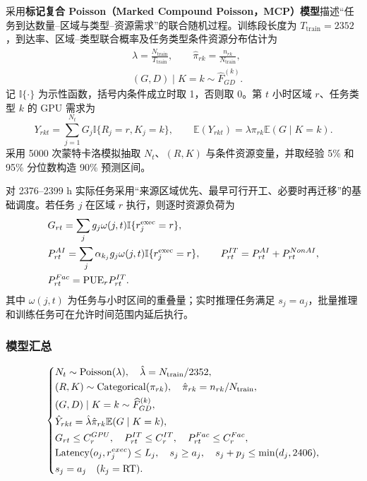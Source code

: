 采用\textbf{标记复合 Poisson（Marked Compound Poisson，MCP）模型}描述“任务到达数量--区域与类型--资源需求”的联合随机过程。训练段长度为 $T_{\mathrm{train}}=2352$，到达率、区域--类型联合概率及任务类型条件资源分布估计为
\begin{align}
&\hat\lambda=\frac{N_{\mathrm{train}}}{T_{\mathrm{train}}},\qquad
\hat\pi_{rk}=\frac{n_{rk}}{N_{\mathrm{train}}},\label{eq:q1-params}\\
&(G,D)\mid K=k\sim\widehat F_{GD}^{(k)}.\label{eq:q1-resource-mark}
\end{align}
记 $\mathbb{I}\{\cdot\}$ 为示性函数，括号内条件成立时取 1，否则取 0。第 $t$ 小时区域 $r$、任务类型 $k$ 的 GPU 需求为
\begin{equation}
Y_{rkt}=\sum_{j=1}^{N_t}G_j\mathbb{I}\{R_j=r,K_j=k\},\qquad
\mathbb E(Y_{rkt})=\lambda\pi_{rk}\mathbb E(G\mid K=k).
\label{eq:q1-demand}
\end{equation}
采用 5000 次蒙特卡洛模拟抽取 $N_t$、$(R,K)$ 与条件资源变量，并取经验 5\% 和 95\% 分位数构造 90\% 预测区间。

对 2376--2399 h 实际任务采用“来源区域优先、最早可行开工、必要时再迁移”的基础调度。若任务 $j$ 在区域 $r$ 执行，则逐时资源负荷为
\begin{align}
&G_{rt}=\sum_j g_j\omega(j,t)\mathbb{I}\{r_j^{\rm exec}=r\},\label{eq:q1-gpu-load}\\
&P^{AI}_{rt}=\sum_j\alpha_{k_j}g_j\omega(j,t)\mathbb{I}\{r_j^{\rm exec}=r\},\qquad
P^{IT}_{rt}=P^{AI}_{rt}+P^{NonAI}_{rt},\label{eq:q1-it-load}\\
&P^{Fac}_{rt}=\mathrm{PUE}_rP^{IT}_{rt}.\label{eq:q1-fac-load}
\end{align}
其中 $\omega(j,t)$ 为任务与小时区间的重叠量；实时推理任务满足 $s_j=a_j$，批量推理和训练任务可在允许时间范围内延后执行。

\subsubsection{模型汇总}

\begin{equation}
\left\{
\begin{aligned}
&N_t\sim\mathrm{Poisson}(\lambda),\quad \hat\lambda=N_{\rm train}/2352,\\
&(R,K)\sim\mathrm{Categorical}(\pi_{rk}),\quad \hat\pi_{rk}=n_{rk}/N_{\rm train},\\
&(G,D)\mid K=k\sim\widehat F_{GD}^{(k)},\\
&\hat Y_{rkt}=\hat\lambda\hat\pi_{rk}\mathbb E(G\mid K=k),\\
&G_{rt}\le C_r^{GPU},\quad P^{IT}_{rt}\le C_r^{IT},\quad P^{Fac}_{rt}\le C_r^{Fac},\\
&\mathrm{Latency}(o_j,r_j^{exec})\le L_j,\quad s_j\ge a_j,\quad s_j+p_j\le\min(d_j,2406),\\
&s_j=a_j\quad(k_j=\mathrm{RT}).
\end{aligned}
\right.
\label{eq:q1-model-summary}
\end{equation}

